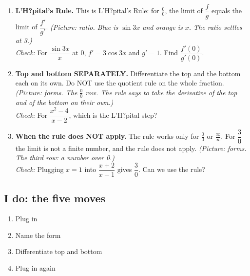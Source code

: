 \documentclass[11pt]{article}
\begin{document}
\begin{enumerate}
\item \textbf{L'H?pital's Rule.} This is L'H?pital's Rule: for $\frac00$, the limit of $\dfrac fg$ equals the limit of $\dfrac{f'}{g'}$. \textit{(Picture: ratio. Blue is $\sin 3x$ and orange is $x$. The ratio settles at 3.)}\\ \textit{Check:} For $\dfrac{\sin3x}{x}$ at 0, $f'=3\cos3x$ and $g'=1$. Find $\dfrac{f'(0)}{g'(0)}$. 
\item \textbf{Top and bottom SEPARATELY.} Differentiate the top and the bottom each on its own. Do NOT use the quotient rule on the whole fraction. \textit{(Picture: forms. The $\frac00$ row. The rule says to take the derivative of the top and of the bottom on their own.)}\\ \textit{Check:} For $\dfrac{x^2-4}{x-2}$, which is the L'H?pital step? 
\item \textbf{When the rule does NOT apply.} The rule works only for $\frac00$ or $\frac{\infty}{\infty}$. For $\dfrac30$ the limit is not a finite number, and the rule does not apply. \textit{(Picture: forms. The third row: a number over 0.)}\\ \textit{Check:} Plugging $x=1$ into $\dfrac{x+2}{x-1}$ gives $\dfrac30$. Can we use the rule? 
\end{enumerate}
\subsection*{I do: the five moves}\begin{enumerate}\item Plug in
\item Name the form
\item Differentiate top and bottom
\item Plug in again\end{enumerate}
\end{document}

